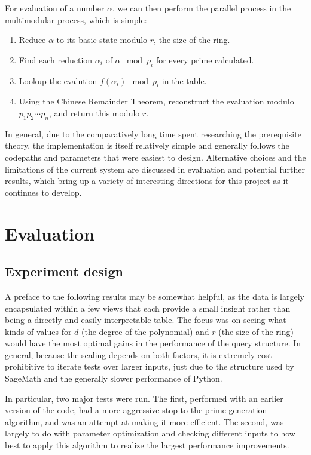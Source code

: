 \documentclass[pageno]{jpaper}
\begin{document}
For evaluation of a number $\alpha$, we can then perform the parallel process in the multimodular process, which is simple:
\begin{enumerate}
  \item 
    Reduce $\alpha$ to its basic state modulo $r$, the size of the ring.
  \item
    Find each reduction $\alpha_i$ of $\alpha \mod p_i$ for every prime calculated.
  \item
    Lookup the evalution $f(\alpha_i)\mod p_i$ in the table.
  \item
    Using the Chinese Remainder Theorem, reconstruct the evaluation modulo $p_1p_2\cdots p_n$, and return this modulo $r$.
\end{enumerate}

In general, due to the comparatively long time spent researching the prerequisite theory, the implementation is itself relatively simple and generally follows the codepaths and parameters that were easiest to design.
Alternative choices and the limitations of the current system are discussed in evaluation and potential further results, which bring up a variety of interesting directions for this project as it continues to develop.

\section{Evaluation}
\subsection{Experiment design}
A preface to the following results may be somewhat helpful, as the data is largely encapsulated within a few views that each provide a small insight rather than being a directly and easily interpretable table.
The focus was on seeing what kinds of values for $d$ (the degree of the polynomial) and $r$ (the size of the ring) would have the most optimal gains in the performance of the query structure.
In general, because the scaling depends on both factors, it is extremely cost prohibitive to iterate tests over larger inputs, just due to the structure used by SageMath and the generally slower performance of Python.

In particular, two major tests were run.
The first, performed with an earlier version of the code, had a more aggressive stop to the prime-generation algorithm, and was an attempt at making it more efficient.
The second, was largely to do with parameter optimization and checking different inputs to how best to apply this algorithm to realize the largest performance improvements.
\end{document}
